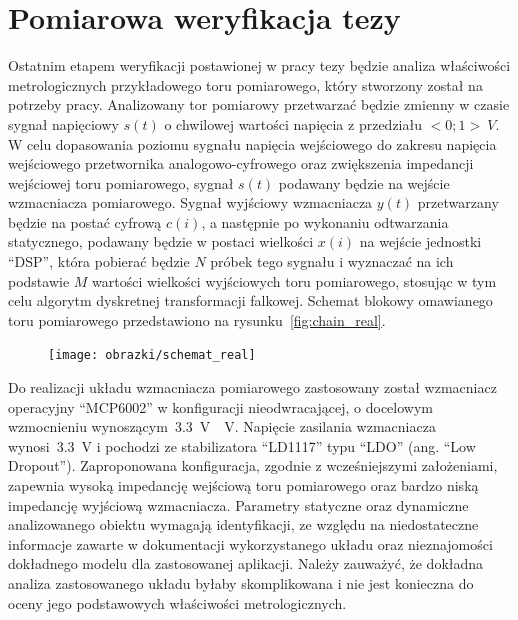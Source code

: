 \chapter{Pomiarowa weryfikacja tezy}

Ostatnim etapem weryfikacji postawionej w pracy tezy będzie analiza właściwości metrologicznych przykładowego toru pomiarowego, który stworzony został na potrzeby pracy. Analizowany tor pomiarowy przetwarzać będzie zmienny w czasie sygnał napięciowy $s(t)$ o chwilowej wartości napięcia z przedziału $<0;1>~\unit{V}$. W celu dopasowania poziomu sygnału napięcia wejściowego do zakresu napięcia wejściowego przetwornika analogowo-cyfrowego oraz zwiększenia impedancji wejściowej toru pomiarowego, sygnał $s(t)$ podawany będzie na wejście wzmacniacza pomiarowego. Sygnał wyjściowy wzmacniacza $y(t)$ przetwarzany będzie na postać cyfrową $c(i)$, a następnie po wykonaniu odtwarzania statycznego, podawany będzie w postaci wielkości $x(i)$ na wejście jednostki \enquote{DSP}, która pobierać będzie $N$ próbek tego sygnału i wyznaczać na ich podstawie $M$ wartości wielkości wyjściowych toru pomiarowego, stosując w tym celu algorytm dyskretnej transformacji falkowej. Schemat blokowy omawianego toru pomiarowego przedstawiono na rysunku~\ref{fig:chain_real}.

\begin{figure}[htb!]
\begin{center}
\texttt{[image: obrazki/schemat\_real]}
\end{center}
\end{figure}

Do realizacji układu wzmacniacza pomiarowego zastosowany został wzmacniacz operacyjny \enquote{MCP6002} w konfiguracji nieodwracającej, o docelowym wzmocnieniu wynoszącym~\qty{3.3}{V \per V}. Napięcie zasilania wzmacniacza wynosi~\qty{3.3}{V} i pochodzi ze stabilizatora \enquote{LD1117} typu \enquote{LDO} (ang. \enquote{Low Dropout}). Zaproponowana konfiguracja, zgodnie z wcześniejszymi założeniami, zapewnia wysoką impedancję wejściową toru pomiarowego oraz bardzo niską impedancję wyjściową wzmacniacza. Parametry statyczne oraz dynamiczne analizowanego obiektu wymagają identyfikacji, ze względu na niedostateczne informacje zawarte w dokumentacji wykorzystanego układu oraz nieznajomości dokładnego modelu dla zastosowanej aplikacji. Należy zauważyć, że dokładna analiza zastosowanego układu byłaby skomplikowana i nie jest konieczna do oceny jego podstawowych właściwości metrologicznych.


